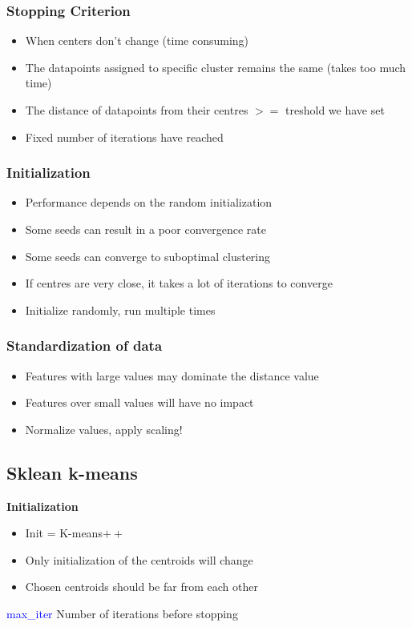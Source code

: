 \subsubsection{Stopping Criterion}
\begin{itemize}
    \item When centers don't change (time consuming)
    \item The datapoints assigned to specific cluster remains the same (takes too much time)
    \item The distance of datapoints from their centres $>=$ treshold we have set
    \item Fixed number of iterations have reached
\end{itemize}

\subsubsection{Initialization}
\begin{itemize}
    \item Performance depends on the random initialization
    \item Some seeds can result in a poor convergence rate
    \item Some seeds can converge to suboptimal clustering
    \item If centres are very close, it takes a lot of iterations to converge
    \item Initialize randomly, run multiple times
\end{itemize}

\subsubsection{Standardization of data}
\begin{itemize}
    \item Features with large values may dominate the distance value
    \item Features over small values will have no impact
    \item Normalize values, apply scaling!
\end{itemize}

\subsection{Sklean k-means}
\textbf{Initialization}
\begin{itemize}
    \item Init = K-means$++$
    \item Only initialization of the centroids will change
    \item Chosen centroids should be far from each other
\end{itemize}
\vspace{10pt}
\textcolor{blue}{max\_iter} Number of iterations before stopping \\

